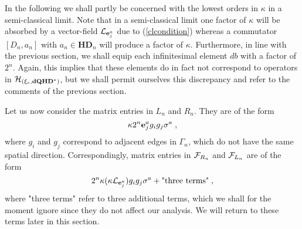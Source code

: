 \documentclass[12pt]{article}
\def\G{\Gamma}
\def\cf{{\cal F}}
\def\ch{{\cal H}}
\def\cl{{\cal L}}
\begin{document}
 
In the following we shall partly be concerned with the lowest orders in $\kappa$ in a semi-classical limit. Note that in a semi-classical limit one factor of $\kappa$ will be absorbed by a vector-field $\cl_{{\bf e}_j^a} $ due to (\ref{clcondition}) whereas a commutator $[D_n , a_n]$ with $a_n\in\mathbf{HD}_n$ will produce a factor of $\kappa$.
Furthermore, in line with the previous section, we shall equip each infinitesimal element $db$ with a factor of $2^n$. Again, this implies that these elements do in fact not correspond to operators in $\ch_{(\xi_c,\mathbf{dQHD}^*)}$, but we shall permit ourselves this discrepancy and refer to the comments of the previous section.

Let us now consider the matrix entries in $L_n$ and $R_n$. They are of the form
$$
\kappa 2^{n}  {\bf e}^a_j g_i  g_j\sigma^a \;,
$$
where $g_i$ and $g_j$ correspond to adjacent edges in $\G_n$, which do not have the same spatial direction. Correspondingly, matrix entries in $\cf_{R_n}$ and $\cf_{L_n}$ are of the form
\begin{equation}
2^n \kappa ( \kappa \cl_{{\bf e}_j^a} ) g_i    g_j  \sigma^a + \mbox{"three terms"} \;,
\label{strand}
\end{equation}
where "three terms" refer to three additional terms, which we shall for the moment ignore since they do not affect our analysis. We will return to these terms later in this section.
\end{document}
